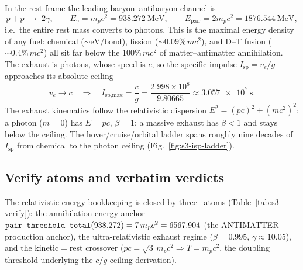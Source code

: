 In the rest frame the leading baryon--antibaryon channel is
\begin{equation}
\bar p + p \;\longrightarrow\; 2\gamma,
\qquad
E_\gamma = m_p c^2 = \SI{938.272}{\mega\electronvolt},
\qquad
E_{\text{pair}} = 2 m_p c^2 = \SI{1876.544}{\mega\electronvolt},
\label{eq:s3-annih}
\end{equation}
i.e.\ the entire rest mass converts to photons. This is the maximal
energy density of any fuel: chemical ($\sim\!\text{eV/bond}$), fission
($\sim\!0.09\%\,mc^2$), and D--T fusion ($\sim\!0.4\%\,mc^2$) all sit far
below the $100\%\,mc^2$ of matter--antimatter annihilation. The exhaust
is photons, whose speed is $c$, so the specific impulse
$I_{\text{sp}}=v_e/g$ approaches its absolute ceiling
\begin{equation}
v_e\to c
\quad\Longrightarrow\quad
I_{\text{sp,max}} = \frac{c}{g}
 = \frac{2.998\times10^8}{9.80665}
 \approx \SI{3.057e7}{\second}.
\label{eq:s3-isp}
\end{equation}
The exhaust kinematics follow the relativistic dispersion
$E^2=(pc)^2+(mc^2)^2$: a photon ($m=0$) has $E=pc$, $\beta=1$; a massive
exhaust has $\beta<1$ and stays below the ceiling. The hover/cruise/orbital
ladder spans roughly nine decades of $I_{\text{sp}}$ from chemical to the
photon ceiling (Fig.~\ref{fig:s3-isp-ladder}).

\subsection{Verify atoms and verbatim verdicts}
\label{app:stage3-verify}

The relativistic energy bookkeeping is closed by three \tierGreen\ atoms
(Table~\ref{tab:s3-verify}): the annihilation-energy anchor
$\verb|pair_threshold_total|(938.272)=7\,m_pc^2=6567.904$ (the
ANTIMATTER production anchor), the ultra-relativistic exhaust regime
($\beta=0.995$, $\gamma\!\approx\!10.05$), and the kinetic$=$rest
crossover ($pc=\sqrt3\,m_pc^2\Rightarrow T=m_pc^2$, the doubling threshold
underlying the $c/g$ ceiling derivation).

